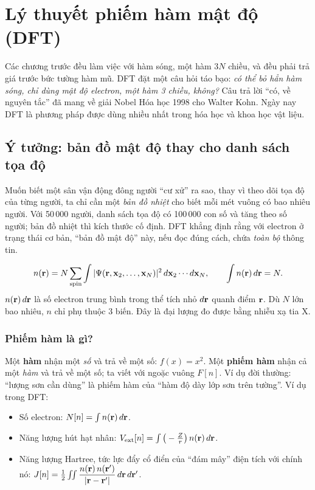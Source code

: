 \chapter{Lý thuyết phiếm hàm mật độ (DFT)}
\label{ch:dft}

Các chương trước đều làm việc với hàm sóng, một hàm $3N$ chiều, và đều phải trả giá trước bức tường hàm mũ. DFT đặt một câu hỏi táo bạo: \emph{có thể bỏ hẳn hàm sóng, chỉ dùng mật độ electron, một hàm 3 chiều, không?} Câu trả lời ``có, về nguyên tắc'' đã mang về giải Nobel Hóa học 1998 cho Walter Kohn. Ngày nay DFT là phương pháp được dùng nhiều nhất trong hóa học và khoa học vật liệu.

\section{Ý tưởng: bản đồ mật độ thay cho danh sách tọa độ}

\begin{eli5}
Muốn biết một sân vận động đông người ``cư xử'' ra sao, thay vì theo dõi tọa độ của từng người, ta chỉ cần một \emph{bản đồ nhiệt} cho biết mỗi mét vuông có bao nhiêu người. Với 50\,000 người, danh sách tọa độ có 100\,000 con số và tăng theo số người; bản đồ nhiệt thì kích thước cố định. DFT khẳng định rằng với electron ở trạng thái cơ bản, ``bản đồ mật độ'' này, nếu đọc đúng cách, chứa \emph{toàn bộ} thông tin.
\end{eli5}

\begin{congthuc}
\[
n(\mathbf r)=N\sum_{\text{spin}}\int|\Psi(\mathbf r,\mathbf x_2,\ldots,\mathbf x_N)|^2\,d\mathbf x_2\cdots d\mathbf x_N ,\qquad \int n(\mathbf r)\,d\mathbf r=N .
\]
$n(\mathbf r)\,d\mathbf r$ là số electron trung bình trong thể tích nhỏ $d\mathbf r$ quanh điểm $\mathbf r$. Dù $N$ lớn bao nhiêu, $n$ chỉ phụ thuộc 3 biến. Đây là đại lượng đo được bằng nhiễu xạ tia X.
\end{congthuc}

\subsection{Phiếm hàm là gì?}
Một \textbf{hàm} nhận một \emph{số} và trả về một số: $f(x)=x^2$. Một \textbf{phiếm hàm}  nhận cả một \emph{hàm} và trả về một số; ta viết với ngoặc vuông $F[n]$. Ví dụ đời thường: ``lượng sơn cần dùng'' là phiếm hàm của ``hàm độ dày lớp sơn trên tường''. Ví dụ trong DFT:
\begin{itemize}
\item Số electron: $N[n]=\int n(\mathbf r)\,d\mathbf r$.
\item Năng lượng hút hạt nhân: $V_{\rm ext}[n]=\int\big(-\tfrac{Z}{r}\big)\,n(\mathbf r)\,d\mathbf r$.
\item Năng lượng Hartree, tức lực đẩy cổ điển của ``đám mây'' điện tích với chính nó: $J[n]=\tfrac12\iint\dfrac{n(\mathbf r)\,n(\mathbf r')}{|\mathbf r-\mathbf r'|}\,d\mathbf r\,d\mathbf r'$.
\end{itemize}

